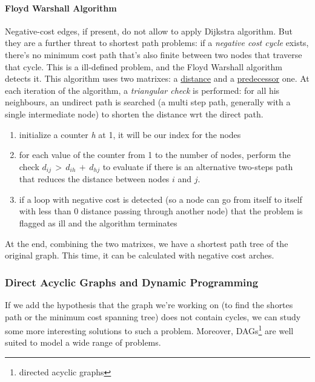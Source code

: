         \paragraph{Floyd Warshall Algorithm}
            Negative-cost edges, if present, do not allow to apply Dijkstra algorithm. But they are a further threat to shortest path problems: if a \textit{negative cost cycle} exists, there's no minimum cost path that's also finite between two nodes that traverse that cycle. This is a ill-defined problem, and the Floyd Warshall algorithm detects it. This algorithm uses two matrixes: a \underline{distance} and a \underline{predecessor} one. At each iteration of the algorithm, a \textit{triangular check} is performed: for all his neighbours, an undirect path is searched (a multi step path, generally with a single intermediate node) to shorten the distance wrt the direct path.
            \begin{enumerate}
                \item initialize a counter \emph{h} at 1, it will be our index for the nodes
                \item for each value of the counter from 1 to the number of nodes, perform the check $d_{ij}\, >\, d_{ih}\, +\, d_{hj}$ to evaluate if there is an alternative two-steps path that reduces the distance between nodes $i$ and $j$.
                \item if a loop with negative cost is detected (so a node can go from itself to itself with less than 0 distance passing through another node) that the problem is flagged as ill and the algorithm terminates
            \end{enumerate}
            At the end, combining the two matrixes, we have a shortest path tree of the original graph. This time, it can be calculated with negative cost arches.

        \subsubsection{Direct Acyclic Graphs and Dynamic Programming}
            If we add the hypothesis that the graph we're working on (to find the shortes path or the minimum cost spanning tree) does not contain cycles, we can study some more interesting solutions to such a problem. Moreover, DAGs\footnote{directed acyclic graphs} are well suited to model a wide range of problems.

